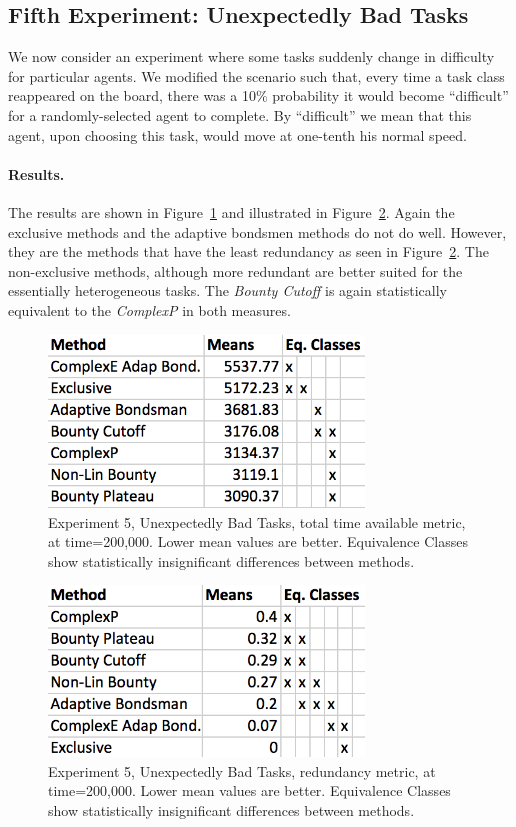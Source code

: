 \documentclass[letterpaper]{aamas2015}
\newcommand\paragrapha[1]{\paragraph*{{#1}.}}
\begin{document}
\subsection{Fifth Experiment: Unexpectedly Bad Tasks}
We now consider an experiment where some tasks suddenly change in difficulty for particular agents. We modified the scenario such that, every time a task class reappeared on the board, there was a 10\% probability it would become ``difficult'' for a randomly-selected agent to complete.  By ``difficult'' we mean that this agent, upon choosing this task, would move at 
one-tenth his normal speed.

\paragrapha{Results} 

The results are shown in Figure~\ref{trapsT} and illustrated in Figure~\ref{trapsR}.  Again the exclusive methods and the adaptive bondsmen methods do not do well.  However, they are the methods that have the least redundancy as seen in Figure~\ref{trapsR}.  The non-exclusive methods, although more redundant are better suited for the essentially heterogeneous tasks.  The \textit{Bounty Cutoff} is again statistically equivalent to the \textit{ComplexP} in both measures.


\begin{figure}[t]
\begin{center}\includegraphics[width=3.3in]{trapsT.png}\end{center}
\vspace{-0.5em}\caption{Experiment 5, Unexpectedly Bad Tasks, total time available metric, at time=200,000.  Lower mean values are better.  Equivalence Classes show statistically insignificant differences between methods.}
\label{trapsT}
\end{figure}

\begin{figure}[t]
\begin{center}\includegraphics[width=3.3in]{trapsR.png}\end{center}
\vspace{-0.5em}\caption{Experiment 5, Unexpectedly Bad Tasks, redundancy metric, at time=200,000.  Lower mean values are better.  Equivalence Classes show statistically insignificant differences between methods.}
\label{trapsR}
\end{figure}
\end{document}
